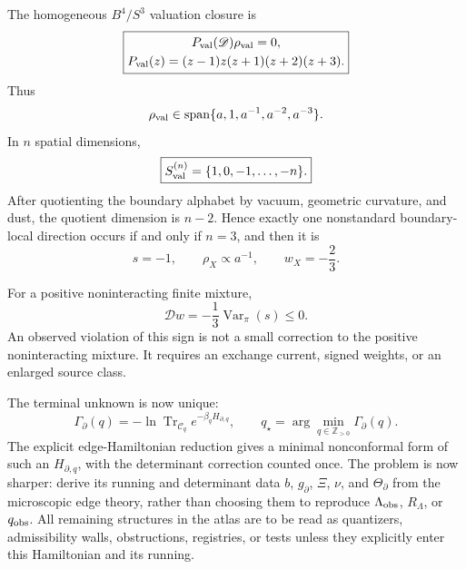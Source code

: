 \documentclass[aps,prd,reprint,nofootinbib,superscriptaddress,floatfix]{revtex4-2}
\numberwithin{equation}{section}
\theoremstyle{definition}
\theoremstyle{plain}
\newcommand{\Dil}{\mathscr D}
\newcommand{\spanop}{\operatorname{span}}
\begin{document}
The homogeneous \(B^4/S^3\) valuation closure is
\begin{equation}
\boxed{
\begin{gathered}
P_{\rm val}(\Dil)\rho_{\rm val}=0,\\
P_{\rm val}(z)=(z-1)z(z+1)(z+2)(z+3).
\end{gathered}}
\end{equation}
Thus
\begin{equation}
\rho_{\rm val}\in\spanop\{a,1,a^{-1},a^{-2},a^{-3}\}.
\end{equation}
In \(n\) spatial dimensions,
\begin{equation}
\boxed{
S_{\rm val}^{(n)}=\{1,0,-1,\ldots,-n\}.
}
\end{equation}
After quotienting the boundary alphabet by vacuum, geometric curvature, and dust, the quotient dimension is \(n-2\).  Hence exactly one nonstandard boundary-local direction occurs if and only if \(n=3\), and then it is
\begin{equation}
\boxed{
s=-1,\qquad \rho_X\propto a^{-1},\qquad w_X=-\frac23.
}
\end{equation}

For a positive noninteracting finite mixture,
\begin{equation}
\boxed{
\Dil w=-\frac13\operatorname{Var}_\pi(s)\le0.
}
\end{equation}
An observed violation of this sign is not a small correction to the positive noninteracting mixture.  It requires an exchange current, signed weights, or an enlarged source class.

The terminal unknown is now unique:
\begin{equation}
\boxed{
\Gamma_\partial(q)
=
-\ln\operatorname{Tr}_{\mathcal C_q}
e^{-\beta_qH_{\partial,q}},
\qquad
q_\star=\arg\min_{q\in\mathbb Z_{>0}}\Gamma_\partial(q).
}
\end{equation}
The explicit edge-Hamiltonian reduction gives a minimal nonconformal form of such an \(H_{\partial,q}\), with the determinant correction counted once.  The problem is now sharper: derive its running and determinant data \(b\), \(g_\partial\), \(\Xi\), \(\nu\), and \(\Theta_\partial\) from the microscopic edge theory, rather than choosing them to reproduce \(\Lambda_{\rm obs}\), \(R_\Lambda\), or \(q_{\rm obs}\).  All remaining structures in the atlas are to be read as quantizers, admissibility walls, obstructions, registries, or tests unless they explicitly enter this Hamiltonian and its running.
\end{document}
